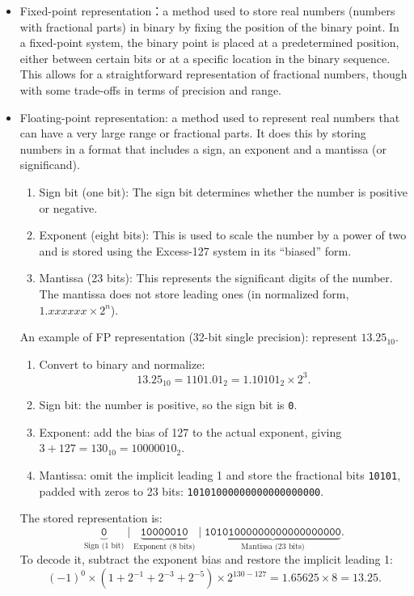 \documentclass[a4paper,12pt]{article}
\begin{document}
\begin{itemize}
\item Fixed-point representation：a method used to store real numbers (numbers with fractional parts) in binary by fixing the position of the binary point. In a fixed-point system, the binary point is placed at a predetermined position, either between certain bits or at a specific location in the binary sequence. This allows for a straightforward representation of fractional numbers, though with some trade-offs in terms of precision and range.
\item Floating-point representation: a method used to represent real numbers that can have a very large range or fractional parts. It does this by storing numbers in a format that includes a sign, an exponent and a mantissa (or significand).
\begin{enumerate}
    \item Sign bit (one bit): The sign bit determines whether the number is positive or negative. 
    \item Exponent (eight bits): 
This is used to scale the number by a power of two and is stored using the Excess-127 system in its “biased” form.
\item Mantissa (23 bits): 
This represents the significant digits of the number. The mantissa does not store leading ones (in normalized form, $1.xxxxxx\times 2^n$). 
\end{enumerate}
An example of FP representation (32-bit single precision): represent $13.25_{10}$.
\begin{enumerate}
    \item Convert to binary and normalize:
    \[
    13.25_{10} = 1101.01_2 = 1.10101_2 \times 2^3.
    \]
    \item Sign bit: the number is positive, so the sign bit is \texttt{0}.
    \item Exponent: add the bias of 127 to the actual exponent, giving $3 + 127 = 130_{10} = 10000010_2$.
    \item Mantissa: omit the implicit leading 1 and store the fractional bits \texttt{10101}, padded with zeros to 23 bits: \texttt{10101000000000000000000}.
\end{enumerate}
The stored representation is:
\[
\underbrace{\texttt{0}}_{\text{Sign (1 bit)}}\;\vert\;
\underbrace{\texttt{10000010}}_{\text{Exponent (8 bits)}}\;\vert\;
\underbrace{\texttt{10101000000000000000000}}_{\text{Mantissa (23 bits)}}.
\]
To decode it, subtract the exponent bias and restore the implicit leading 1:
\[
(-1)^0 \times (1 + 2^{-1} + 2^{-3} + 2^{-5}) \times 2^{130-127}
= 1.65625 \times 8 = 13.25.
\]
\end{itemize}
\end{document}
